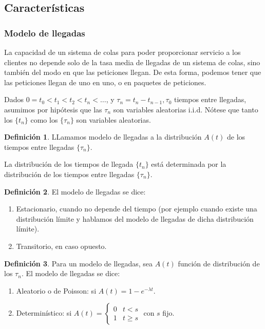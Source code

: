 \documentclass[a4paper,10pt]{scrartcl}
\theoremstyle{definition}
\newtheorem*{mydef}{Definición}
\theoremstyle{definition}
\newtheorem*{mydef}{Definición}
\numberwithin{equation}{section}
\begin{document}
	\subsection{Características}
	\subsubsection{Modelo de llegadas}
	La capacidad de un sistema de colas para poder proporcionar servicio a los clientes no depende solo de la tasa media
	de llegadas de un sistema de colas, sino también del modo en que las peticiones llegan. De esta forma, podemos
	tener que las peticiones llegan de uno en uno, o en paquetes de peticiones.
	
	Dados $0=t_0 < t_1 < t_2 < t_n < \ldots$, y $\tau_n = t_n - t_{n-1}, \tau_0$ tiempos entre llegadas, asumimos por hipótesis
	que las $\tau_n$ son variables aleatorias i.i.d. Nótese que tanto los $\{t_n\}$ como los $\{\tau_n\}$ son
	variables aleatorias.
	
	\begin{mydef}
		LLamamos modelo de llegadas a la distribución $A(t)$ de los tiempos entre llegadas $\{\tau_n\}$.
	\end{mydef}
	
	La distribución de los tiempos de llegada $\{t_n\}$ está determinada por la distribución de los tiempos entre
	llegadas $\{\tau_n\}$. 
	
	\begin{mydef}
		El modelo de llegadas se dice:
		
		\begin{enumerate}
			\item Estacionario, cuando no depende del tiempo (por ejemplo cuando existe una distribución límite y hablamos
			del modelo de llegadas de dicha distribución límite).
			\item Transitorio, en caso opuesto.
		\end{enumerate}
	\end{mydef}
	
	
	\begin{mydef}
		Para un modelo de llegadas, sea $A(t)$ función de distribución de los $\tau_n$. 
		El modelo de llegadas se dice:
		
		\begin{enumerate}
			\item Aleatorio o de Poisson: si $A(t) = 1 - e^{-\lambda t}$.
			\item Determinístico: si $A(t) = \left\{\begin{array}{ll}
			0 & t<s \\
			1 & t\ge s
			\end{array}\right.$ con $s$ fijo.
			
		\end{enumerate}
	\end{mydef}
	
\end{document}
